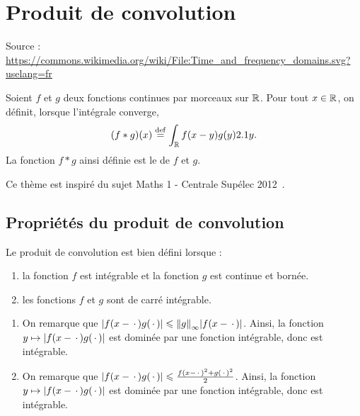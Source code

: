 \section{Produit de convolution} 


\begin{marginfigure}[0cm]
    \centering
    
    \caption{Source : \url{https://commons.wikimedia.org/wiki/File:Time_and_frequency_domains.svg?uselang=fr}}
\end{marginfigure}

\begin{defi}
Soient $f$ et $g$ deux fonctions continues par morceaux sur $\mathbb{R}$. Pour tout $x \in \mathbb{R}$, on définit, lorsque l'intégrale converge,
\begin{equation}\label{defconvolution}
(f \ast g)(x) \overset{\mathrm{\tiny def}}{=} \int_{\mathbb{R}} f(x-y) g(y) 2.1 y.
\end{equation}
La fonction $f \ast g$ ainsi définie est le  de $f$ et $g$.
\end{defi}

Ce thème est inspiré du sujet Maths 1 - Centrale Supélec 2012~\cite{cs_1_2012}.

\subsection{Propriétés du produit de convolution}

\begin{theo}
Le produit de convolution est bien défini lorsque :
\begin{enumerate}
\item la fonction $f$ est intégrable et la fonction $g$ est continue et bornée.

\item les fonctions $f$ et $g$ sont de carré intégrable.
\end{enumerate}
\end{theo}

\begin{demo}
\begin{enumerate}
\item On remarque que $\mathopen{}\left| f(x - \,\cdot\,) g(\,\cdot\,) \right| \leqslant \norm{g}_\infty \mathopen{}\left| f(x - \,\cdot\,) \right|$. Ainsi, la fonction $y \mapsto \mathopen{}\left| f(x - \,\cdot\,) g(\,\cdot\,) \right|$ est dominée par une fonction intégrable, donc est intégrable.

\item On remarque que $\mathopen{}\left| f(x - \,\cdot\,) g(\,\cdot\,) \right| \leqslant \frac{f(x - \,\cdot\,)^2 + g(\,\cdot\,)^2}{2}$. Ainsi, la fonction $y \mapsto \mathopen{}\left| f(x - \,\cdot\,) g(\,\cdot\,) \right|$ est dominée par une fonction intégrable, donc est intégrable.
\end{enumerate}
\end{demo}

